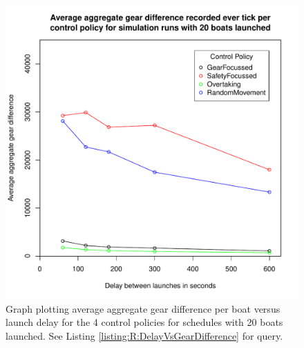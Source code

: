 \begin{figure}
\begin{center}
  \includegraphics[scale=0.8]{"images/graphs/Average aggregate gear difference recorded ever tick per control policy for simulation runs with 20 boats launched"}
  \caption{Graph plotting average aggregate gear difference per boat versus launch delay for the 4 control policies for schedules with 20 boats launched. See Listing \ref{listing:R:DelayVsGearDifference} for query.}
  \label{appendix:graphs:gear_difference_20_launches}
\end{center}
\end{figure}

